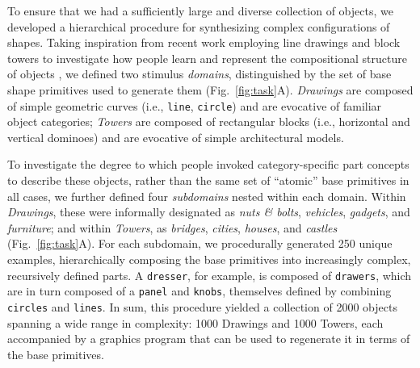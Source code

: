 

To ensure that we had a sufficiently large and diverse collection of objects, we developed a hierarchical procedure for synthesizing complex configurations of shapes. 
Taking inspiration from recent work employing line drawings and block towers to investigate how people learn and represent the compositional structure of objects , we defined two stimulus \textit{domains}, distinguished by the set of base shape primitives used to generate them (Fig.~\ref{fig:task}A).
\textit{Drawings} are composed of simple geometric curves (i.e., \texttt{line}, \texttt{circle}) and are evocative of familiar object categories; \textit{Towers} are composed of rectangular blocks (i.e., horizontal and vertical dominoes) and are evocative of simple architectural models.

To investigate the degree to which people invoked category-specific part concepts to describe these objects, rather than the same set of ``atomic'' base primitives in all cases, we further defined four \textit{subdomains} nested within each domain. 
Within \textit{Drawings}, these were informally designated as \textit{nuts \& bolts}, \textit{vehicles}, \textit{gadgets}, and \textit{furniture}; and within \textit{Towers}, as \textit{bridges}, \textit{cities}, \textit{houses}, and \textit{castles} (Fig.~\ref{fig:task}A).
For each subdomain, we procedurally generated 250 unique examples, hierarchically composing the base primitives into increasingly complex, recursively defined parts. 
A \texttt{dresser}, for example, is composed of \texttt{drawers}, which are in turn composed of a \texttt{panel} and \texttt{knobs}, themselves defined by combining \texttt{circles} and \texttt{lines}.
In sum, this procedure yielded a collection of 2000 objects spanning a wide range in complexity: 1000 Drawings and 1000 Towers, each accompanied by a graphics program that can be used to regenerate it in terms of the base primitives.

